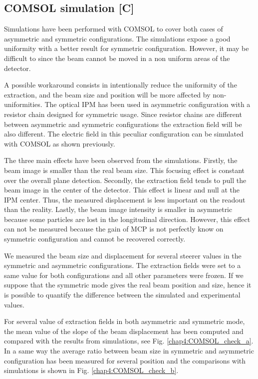 \begin{refsection}
  

  \subsection{COMSOL simulation [C]}
  Simulations have been performed with COMSOL to cover both cases of asymmetric and symmetric configurations. The simulations expose a good uniformity with a  better result for symmetric configuration. However, it may be difficult to since the beam cannot be moved in a non uniform areas of the detector.

  A possible workaround consists in intentionally reduce the uniformity of the extraction, and the beam size and position will be more affected by non-uniformities. The optical IPM has been used in asymmetric configuration with a resistor chain designed for symmetric usage. Since resistor chains are different between asymmetric and symmetric configurations the extraction field will be also different. The electric field in this peculiar configuration can be simulated with COMSOL as shown previously.

  The three main effects have been observed from the simulations. Firstly, the beam image is smaller than the real beam size. This focusing effect is constant over the overall plane detection. Secondly, the extraction field tends to pull the beam image in the center of the detector. This effect is linear and null at the IPM center. Thus, the measured displacement is less important on the readout than the reality. Lastly, the beam image intensity is smaller in asymmetric because some particles are lost in the longitudinal direction. However, this effect can not be measured because the gain of MCP is not perfectly know on symmetric configuration and cannot be recovered correctly.

  We measured the beam size and displacement for several steerer values in the symmetric and asymmetric configurations.
  The extraction fields were set to a same value for both configurations and all other parameters were frozen. If we suppose that the symmetric mode gives the real beam position and size, hence it is possible to quantify the difference between the simulated and experimental values.

  For several value of extraction fields in both asymmetric and symmetric mode, the mean value of the slope of the beam displacement has been computed and compared with the results from simulations, see Fig. \ref{chap4:COMSOL_check_a}. In a same way the average ratio between beam size in symmetric and asymmetric configuration has been measured for several position and the comparisons with simulations is shown in Fig. \ref{chap4:COMSOL_check_b}.


\end{refsection}
